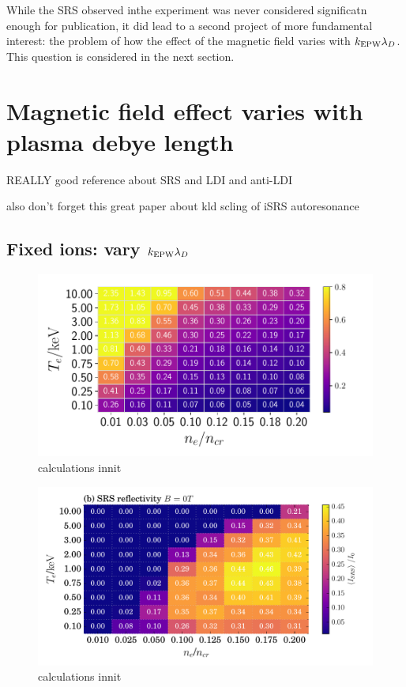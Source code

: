 While the SRS observed inthe experiment was never considered significatn enough for publication, it did lead to a second project of more fundamental interest: the problem of how the effect of the magnetic field varies with $k_\mathrm{EPW}\lambda_D$. This question is considered in the next section.

\section{Magnetic field effect varies with plasma debye length}

\citep{Feng2018} REALLY good reference about SRS and LDI and anti-LDI

also don't forget this great paper about kld scling of iSRS autoresonance \citep{Chapman2013}

\subsection{Fixed ions: vary $k_\mathrm{EPW}\lambda_D$}

\begin{figure}[ht]
   \centering
    \includegraphics[width=\columnwidth]{Chapters/C6_magSRS/kld_scan_ben_simon.pdf}
    \caption{calculations innit}
    \label{fig:kld_scan}
\end{figure}{}

\begin{figure}[ht]
   \centering
    \includegraphics[width=\columnwidth]{Chapters/C6_magSRS/reflectivity_B0T.pdf}
    \caption{calculations innit}
    \label{fig:refl_B0T}
\end{figure}{}

